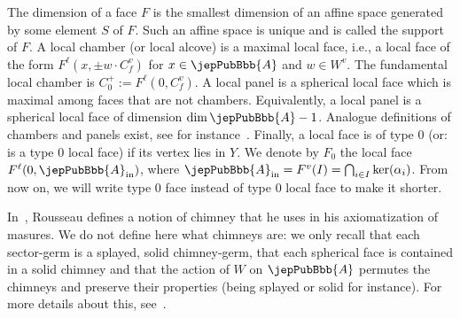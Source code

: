The dimension of a face $F$ is the smallest dimension of an affine space generated by some element $S$ of $F$. Such an affine space is unique and is called the support of $F$. A local chamber (or local alcove) is a maximal local face, i.e., a local face of the form $F^\ell(x,\pm w\cdot C_f^v)$ for $x\in\jepPubBbb{A}$ and $w\in W^v$. The fundamental local chamber is $C_0^+:=F^\ell(0,C_f^v)$. A local panel is a spherical local face which is maximal among faces that are not chambers. Equivalently, a local panel is a spherical local face of dimension $\dim\jepPubBbb{A}-1$. Analogue definitions of chambers and panels exist, see for instance~\cite[\S1.4]{jep88refGR08}. Finally, a local face is of type $0$ (or: is a type $0$ local face) if its vertex lies in $Y$. We denote by $F_0$ the local face $F^\ell(0,\jepPubBbb{A}_{\mathrm{in}})$, where $\jepPubBbb{A}_{\mathrm{in}}=F^v(I)=\bigcap_{i\in I}\ker(\alpha_i)$. From now on, we will write type $0$ face instead of type $0$ local face to make it shorter.
\begin{remark}\label{jep88localRemark2_3}
In~\cite{jep88refRou11}, Rousseau defines a notion of chimney that he uses in his axiomatization of masures. We do not define here what chimneys are: we only recall that each sector-germ is a splayed, solid chimney-germ, that each spherical face is contained in a solid chimney and that the action of $W$ on $\jepPubBbb{A}$ permutes the chimneys and preserve their properties (being splayed or solid for instance). For more details about this, see~\cite[\S1.10]{jep88refRou11}.
\end{remark}
